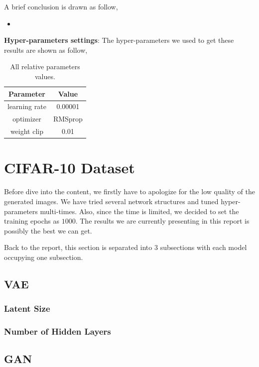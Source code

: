 \documentclass[12pt,letterpaper]{article}
\begin{document}
A brief conclusion is drawn as follow,
\begin{itemize}
    \item 
\end{itemize}

\textbf{Hyper-parameters settings}: The hyper-parameters we used to get these results are shown as follow,
\begin{table}[h]
        \centering
        \vspace{\baselineskip}
        \caption{All relative parameters values.}\label{T:parameters}
      \begin{tabular}{cc}
        \hline
        Parameter & Value\\
        \hline
        learning rate & 0.00001\\
        optimizer & RMSprop\\
        weight clip & 0.01\\
        \hline
      \end{tabular}
\end{table}


\newpage
\section{CIFAR-10 Dataset}

Before dive into the content, we firstly have to apologize for the low quality of the generated images. We have tried several network structures and tuned hyper-parameters multi-times. Also, since the time is limited, we decided to set the training epochs as $1000$. The results we are currently presenting in this report is possibly the best we can get.

Back to the report, this section is separated into $3$ subsections with each model occupying one subsection.

\subsection{VAE}

\subsubsection{Latent Size}

\subsubsection{Number of Hidden Layers}

\subsection{GAN}
\end{document}
